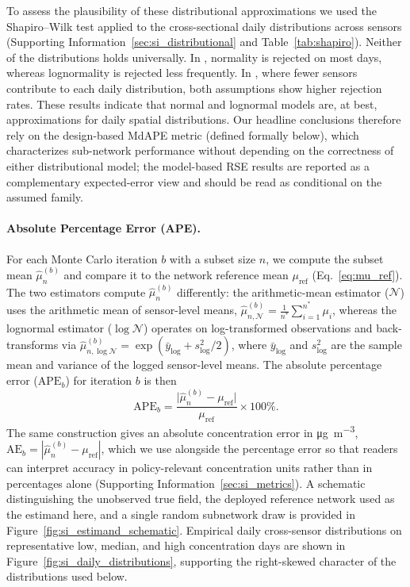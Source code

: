 \documentclass[12pt]{article}
\theoremstyle{remark}
\newcommand{\units}{\si{\micro\gram\per\cubic\meter}}
\newcommand{\city}[1]{\capitalisewords{\MakeLowercase{#1}}}
\begin{document}
To assess the plausibility of these distributional approximations we used the Shapiro--Wilk test applied to the cross-sectional daily distributions across sensors (Supporting Information~\ref{sec:si_distributional} and Table~\ref{tab:shapiro}). Neither of the distributions holds universally. In \city{Lucknow}, normality is rejected on most days, whereas lognormality is rejected less frequently. In \city{Dhaka}, where fewer sensors contribute to each daily distribution, both assumptions show higher rejection rates. These results indicate that normal and lognormal models are, at best, approximations for daily spatial distributions. Our headline conclusions therefore rely on the design-based MdAPE metric (defined formally below), which characterizes sub-network performance without depending on the correctness of either distributional model; the model-based RSE results are reported as a complementary expected-error view and should be read as conditional on the assumed family.

\paragraph{Absolute Percentage Error (APE).}\label{sec:APE}
For each Monte Carlo iteration $b$ with a subset size $n$, we compute the subset mean $\widehat{\mu}^{(b)}_{n}$ and compare it to the  network reference mean $\mu_{\mathrm{ref}}$ (Eq.~\ref{eq:mu_ref}). The two estimators compute $\widehat{\mu}^{(b)}_{n}$ differently: the arithmetic-mean estimator ($\mathcal{N}$) uses the arithmetic mean of sensor-level means, $\widehat{\mu}^{(b)}_{n,\mathcal{N}} = \frac{1}{n^*}\sum_{i=1}^{n^*} \mu_i$, whereas the lognormal estimator ($\log\mathcal{N}$) operates on log-transformed observations and back-transforms via $\widehat{\mu}^{(b)}_{n,\log\mathcal{N}} = \exp(\bar{y}_{\log} + s^2_{\log}/2)$, where $\bar{y}_{\log}$ and $s^2_{\log}$ are the sample mean and variance of the logged sensor-level means. The absolute percentage error ($\mathrm{APE}_{b}$) for iteration $b$ is then
\begin{equation}\label{eq:ape}
  \mathrm{APE}_{b} = \frac{ \bigl| \widehat{\mu}^{(b)}_{n} - \mu_{\mathrm{ref}} \bigr| }
       { \mu_{\mathrm{ref}} } \times 100\%.
\end{equation}
The same construction gives an absolute concentration error in \units, $\mathrm{AE}_b = | \widehat{\mu}^{(b)}_{n} - \mu_{\mathrm{ref}} |$, which we use alongside the percentage error so that readers can interpret accuracy in policy-relevant concentration units rather than in percentages alone (Supporting Information~\ref{sec:si_metrics}). A schematic distinguishing the unobserved true field, the deployed reference network used as the estimand here, and a single random subnetwork draw is provided in Figure~\ref{fig:si_estimand_schematic}. Empirical daily cross-sensor distributions on representative low, median, and high concentration days are shown in Figure~\ref{fig:si_daily_distributions}, supporting the right-skewed character of the distributions used below.
\end{document}
